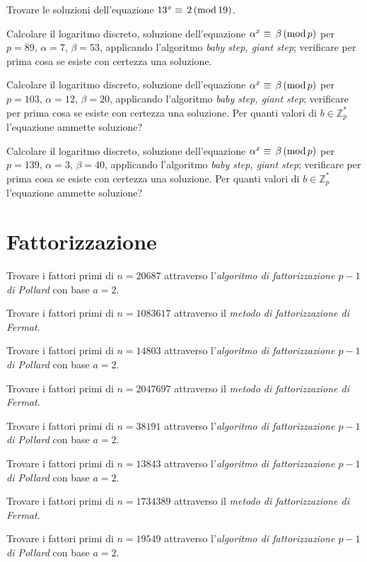         Trovare le soluzioni dell'equazione $13^x\equiv\,2\,(\mathrm{mod}\,19)$.

        Calcolare il logaritmo discreto, soluzione dell'equazione $\alpha^x\equiv\,\beta\,(\mathrm{mod}\,p)$ per 
        $p=89,\, \alpha =7,\, \beta =53$, applicando l'algoritmo \emph{baby step, giant step}; verificare per 
        prima cosa se esiste con certezza una soluzione.

        Calcolare il logaritmo discreto, soluzione dell'equazione $\alpha^x\equiv\,\beta\,(\mathrm{mod}\,p)$ per 
        $p=103,\, \alpha =12,\, \beta =20$, applicando l'algoritmo \emph{baby step, giant step}; verificare per prima 
        cosa se esiste con certezza una soluzione. Per quanti valori di $b\in \mathbb{Z}^{*}_p$ l'equazione 
        ammette soluzione?

        Calcolare il logaritmo discreto, soluzione dell'equazione $\alpha^x\equiv\,\beta\,(\mathrm{mod}\,p)$ per 
        $p=139,\, \alpha =3,\, \beta =40$, applicando l'algoritmo \emph{baby step, giant step}; verificare per prima 
        cosa se esiste con certezza una soluzione. Per quanti valori di $b\in \mathbb{Z}^{*}_p$ l'equazione 
        ammette soluzione?

    \bigskip
    \section{Fattorizzazione}
        Trovare i fattori primi di $n=20687$ attraverso l'\emph{algoritmo di fattorizzazione $p-1$ di Pollard} con 
        base $a=2$.

        Trovare i fattori primi di $n=1083617$ attraverso il \emph{metodo di fattorizzazione di Fermat}.

        Trovare i fattori primi di $n=14803$ attraverso l'\emph{algoritmo di fattorizzazione $p-1$ di Pollard} con 
        base $a=2$.

        Trovare i fattori primi di $n=2047697$ attraverso il \emph{metodo di fattorizzazione di Fermat}.

        Trovare i fattori primi di $n=38191$ attraverso l'\emph{algoritmo di fattorizzazione $p-1$ di Pollard} con 
        base $a=2$.

        Trovare i fattori primi di $n=13843$ attraverso l'\emph{algoritmo di fattorizzazione $p-1$ di Pollard} con 
        base $a=2$.

        Trovare i fattori primi di $n=1734389$ attraverso il \emph{metodo di fattorizzazione di Fermat}.

        Trovare i fattori primi di $n=19549$ attraverso l'\emph{algoritmo di fattorizzazione $p-1$ di Pollard} con 
        base $a=2$.
